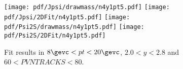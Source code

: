 \begin{figure}[H]
\begin{center}
\texttt{[image: pdf/Jpsi/drawmass/n4y1pt5.pdf]}
\texttt{[image: pdf/Jpsi/2DFit/n4y1pt5.pdf]}
\vspace*{-0.5cm}
\texttt{[image: pdf/Psi2S/drawmass/n4y1pt5.pdf]}
\texttt{[image: pdf/Psi2S/2DFit/n4y1pt5.pdf]}
\vspace*{-0.5cm}
\end{center}
\caption{Fit results in $8\gevc<pt<20\gevc$, $2.0<y<2.8$ and $60<PVNTRACKS<80$.}
\label{Fitn4y1pt5}
\end{figure}
